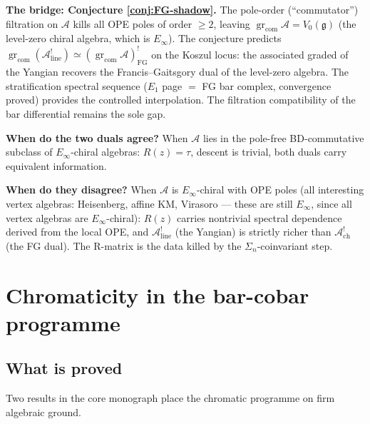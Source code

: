 \documentclass[11pt]{article}
\newcommand{\cA}{\mathcal{A}}
\newcommand{\fg}{\mathfrak{g}}
\DeclareMathOperator{\gr}{gr}
\begin{document}
\medskip\noindent\textbf{The bridge: Conjecture
\textup{\ref{conj:FG-shadow}}.}\enspace
The pole-order (``commutator'') filtration on $\cA$ kills all
OPE poles of order $\ge 2$, leaving
$\gr_{\mathrm{com}}\cA = V_0(\fg)$ (the level-zero chiral
algebra, which is $E_\infty$).  The conjecture predicts
$\gr_{\mathrm{com}}(\cA^!_{\mathrm{line}})
\simeq (\gr_{\mathrm{com}}\cA)^!_{\mathrm{FG}}$
on the Koszul locus: the associated graded of the Yangian
recovers the Francis--Gaitsgory dual of the level-zero algebra.
The stratification spectral sequence ($E_1$ page $=$ FG bar
complex, convergence proved) provides the controlled
interpolation.  The filtration compatibility of the bar
differential remains the sole gap.

\medskip\noindent\textbf{When do the two duals agree?}\enspace
When $\cA$ lies in the pole-free BD-commutative subclass of
$E_\infty$-chiral algebras: $R(z) = \tau$, descent is
trivial, both duals carry equivalent information.

\noindent\textbf{When do they disagree?}\enspace
When $\cA$ is $E_\infty$-chiral with OPE poles (all
interesting vertex algebras: Heisenberg, affine KM,
Virasoro --- these are still $E_\infty$, since all
vertex algebras are $E_\infty$-chiral): $R(z)$
carries nontrivial spectral dependence derived from
the local OPE, and $\cA^!_{\mathrm{line}}$ (the
Yangian) is strictly richer than
$\cA^!_{\mathrm{ch}}$ (the FG dual).
The R-matrix is the data killed by the $\Sigma_n$-coinvariant
step.


\section{Chromaticity in the bar-cobar programme}
\label{sec:chromatic-working-notes}

\subsection{What is proved}

Two results in the core monograph place the chromatic programme
on firm algebraic ground.
\end{document}
